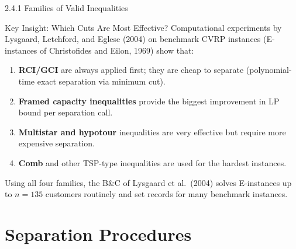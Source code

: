 \documentclass[aspectratio=169,10pt]{beamer}
\begin{document}
\begin{frame}[allowframebreaks]{2.4.1 Families of Valid Inequalities}
  \framebreak

  \begin{alertblock}{Key Insight: Which Cuts Are Most Effective?}
    Computational experiments by Lysgaard, Letchford, and Eglese (2004)
    on benchmark CVRP instances (E-instances of Christofides and Eilon, 1969)
    show that:
    \begin{enumerate}
      \item \textbf{RCI/GCI} are always applied first; they are cheap to
            separate (polynomial-time exact separation via minimum cut).
      \item \textbf{Framed capacity inequalities} provide the biggest
            improvement in LP bound per separation call.
      \item \textbf{Multistar and hypotour} inequalities are very effective
            but require more expensive separation.
      \item \textbf{Comb} and other TSP-type inequalities are used for the
            hardest instances.
    \end{enumerate}
    Using all four families, the B\&C of Lysgaard et al.\ (2004) solves
    E-instances up to $n=135$ customers routinely and set records for many
    benchmark instances.
  \end{alertblock}
\end{frame}

\section{Separation Procedures}
\end{document}
